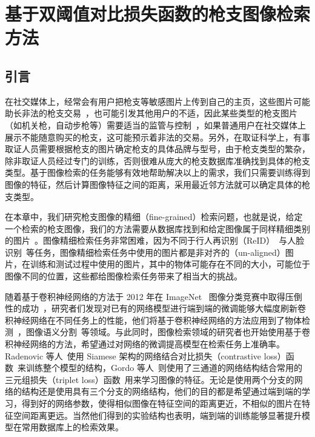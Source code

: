 
\chapter{基于双阈值对比损失函数的枪支图像检索方法}\label{chapter:double_margin}

\section{引言}
在社交媒体上，经常会有用户把枪支等敏感图片上传到自己的主页，这些图片可能助长非法的枪支交易~\cite{Drange2016}，也可能引发其他用户的不适，因此某些类型的枪支图片（如机关枪，自动步枪等）需要适当的监管与控制~\cite{Hsu2018Bumble}，如果普通用户在社交媒体上展示不能随意购买的枪支，这可能预示着非法的交易。另外，在取证科学上，有事取证人员需要根据枪支的图片确定枪支的具体品牌与型号，由于枪支类型的繁杂，除非取证人员经过专门的训练，否则很难从庞大的枪支数据库准确找到具体的枪支类型。基于图像检索的任务能够有效地帮助解决以上的需求，我们只需要训练得到图像的特征，然后计算图像特征之间的距离，采用最近邻方法就可以确定具体的枪支类型。

在本章中，我们研究枪支图像的精细（fine-grained）检索问题，也就是说，给定一个检索的枪支图像，我们的方法需要从数据库找到和给定图像属于同样精细类别的图片~\cite{Song2016DeepML,Wang2017DeepML}。图像精细检索任务非常困难，因为不同于行人再识别（ReID）~\cite{Zhao2013UnsupervisedSL,Li2014DeepReIDDF}与人脸识别~\cite{Wen2016ADF,Taigman2014DeepFaceCT}等任务，图像精细检索任务中使用的图片都是非对齐的（un-aligned）图片，在训练和测试过程中使用的图片，其中的物体可能存在不同的大小，可能位于图像不同的位置，这些都给图像检索任务带来了相当大的挑战。

随着基于卷积神经网络的方法于 2012 年在 ImageNet~\cite{Russakovsky2015ImageNetLS} 图像分类竞赛中取得压倒性的成功~\cite{Krizhevsky2012ImageNetCW}，研究者们发现对已有的网络模型进行端到端的微调能够大幅度刷新卷积神经网络在不同任务上的性能，他们将基于卷积神经网络的方法应用到了物体检测~\cite{Liu2016SSDSS,Redmon2016YouOL,Lin2017FocalLF,Ren2017FasterRT}，图像语义分割~\cite{Shelhamer2017FullyCN,Chen2018DeepLabSI,Noh2015LearningDN}等领域。与此同时，图像检索领域的研究者也开始使用基于卷积神经网络的方法，希望通过对网络的微调提高模型在检索任务上准确率。Radenovic 等人~\cite{Radenovic2016CNNIR}使用 Siamese 架构的网络结合对比损失（contrastive loss）函数~\cite{Chopra2005LearningAS,Hadsell2006DimensionalityRB,Han2015MatchNetUF}来训练整个模型的结构，Gordo 等人~\cite{Gordo2016DeepIR}则使用了三通道的网络结构结合常用的三元组损失（triplet loss）函数~\cite{Schroff2015FaceNetAU,Wang2014LearningFI,G2016LearningLI,Weinberger2006DistanceML}用来学习图像的特征。无论是使用两个分支的网络的结构还是使用具有三个分支的网络结构，他们的目的都是希望通过端到端的学习，得到好的网络参数，使得相似图像在特征空间的距离更近，不相似的图片在特征空间距离更远。当然他们得到的实验结构也表明，端到端的训练能够显著提升模型在常用数据库上的检索效果。

